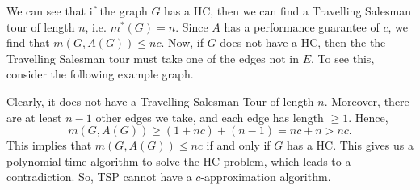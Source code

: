 \documentclass[a4paper, openany]{memoir}
\begin{document}
    \noindent We can see that if the graph $G$ has a HC, then we can find a Travelling Salesman tour of length $n$, i.e. $m^*(G) = n$. Since $A$ has a performance guarantee of $c$, we find that $m(G, A(G)) \leq nc$. Now, if $G$ does not have a HC, then the the Travelling Salesman tour must take one of the edges not in $E$. To see this, consider the following example graph.
    \begin{figure}[H]
        \centering
        \begin{subfigure}[a]{0.45\textwidth}
            \centering
        \end{subfigure}
        \hfill
        \begin{subfigure}[a]{0.45\textwidth}
            \centering
        \end{subfigure}
    \end{figure}
    \noindent Clearly, it does not have a Travelling Salesman Tour of length $n$. Moreover, there are at least $n-1$ other edges we take, and each edge has length $\geq 1$. Hence,
    \[m(G, A(G)) \geq (1 + nc) + (n - 1) = nc + n > nc.\]
    This implies that $m(G, A(G)) \leq nc$ if and only if $G$ has a HC. This gives us a polynomial-time algorithm to solve the HC problem, which leads to a contradiction. So, TSP cannot have a $c$-approximation algorithm.
\end{document}
